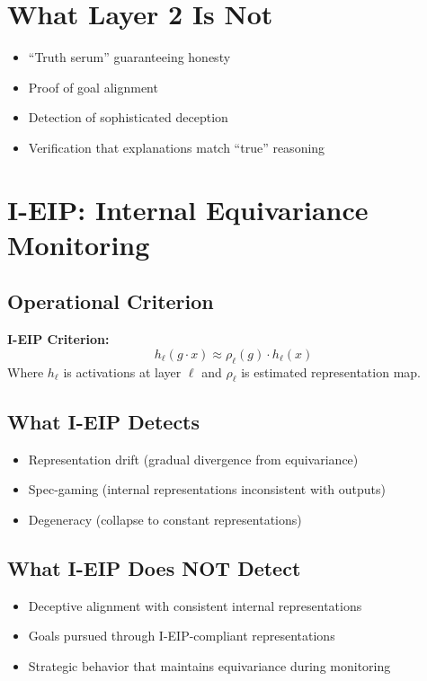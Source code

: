 \documentclass[11pt,letterpaper]{article}
\theoremstyle{definition}
\theoremstyle{remark}
\begin{document}
\section{What Layer 2 Is Not}

\begin{itemize}
\item ``Truth serum'' guaranteeing honesty
\item Proof of goal alignment
\item Detection of sophisticated deception
\item Verification that explanations match ``true'' reasoning
\end{itemize}

\section{I-EIP: Internal Equivariance Monitoring}

\subsection{Operational Criterion}

\textbf{I-EIP Criterion:}
\[
h_\ell(g \cdot x) \approx \rho_\ell(g) \cdot h_\ell(x)
\]
Where $h_\ell$ is activations at layer $\ell$ and $\rho_\ell$ is estimated representation map.

\subsection{What I-EIP Detects}
\begin{itemize}
\item Representation drift (gradual divergence from equivariance)
\item Spec-gaming (internal representations inconsistent with outputs)
\item Degeneracy (collapse to constant representations)
\end{itemize}

\subsection{What I-EIP Does NOT Detect}
\begin{itemize}
\item Deceptive alignment with consistent internal representations
\item Goals pursued through I-EIP-compliant representations
\item Strategic behavior that maintains equivariance during monitoring
\end{itemize}
\end{document}
